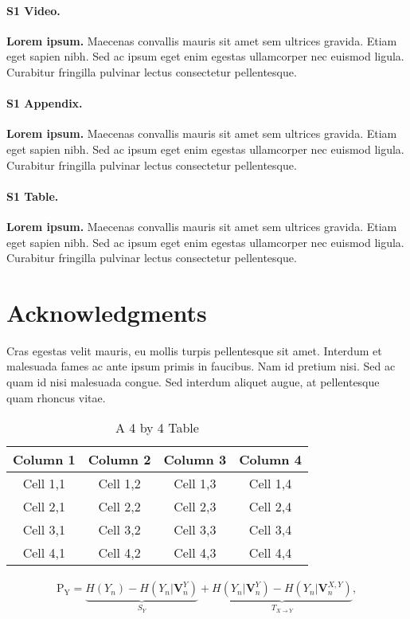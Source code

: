 \documentclass[10pt,letterpaper]{article}
\begin{document}
\paragraph*{S1 Video.}
\label{S1_Video}
{\bf Lorem ipsum.}  Maecenas convallis mauris sit amet sem ultrices gravida. Etiam eget sapien nibh. Sed ac ipsum eget enim egestas ullamcorper nec euismod ligula. Curabitur fringilla pulvinar lectus consectetur pellentesque.

\paragraph*{S1 Appendix.}
\label{S1_Appendix}
{\bf Lorem ipsum.} Maecenas convallis mauris sit amet sem ultrices gravida. Etiam eget sapien nibh. Sed ac ipsum eget enim egestas ullamcorper nec euismod ligula. Curabitur fringilla pulvinar lectus consectetur pellentesque.

\paragraph*{S1 Table.}
\label{S1_Table}
{\bf Lorem ipsum.} Maecenas convallis mauris sit amet sem ultrices gravida. Etiam eget sapien nibh. Sed ac ipsum eget enim egestas ullamcorper nec euismod ligula. Curabitur fringilla pulvinar lectus consectetur pellentesque.

\section*{Acknowledgments}
Cras egestas velit mauris, eu mollis turpis pellentesque sit amet. Interdum et malesuada fames ac ante ipsum primis in faucibus. Nam id pretium nisi. Sed ac quam id nisi malesuada congue. Sed interdum aliquet augue, at pellentesque quam rhoncus vitae.



\begin{table}
  \centering
  \caption{A 4 by 4 Table}
 \begin{tabular}{cccc} %
    \hline %
    Column 1 & Column 2 & Column 3 & Column 4 \\
    \hline %
    Cell 1,1 & Cell 1,2 & Cell 1,3 & Cell 1,4 \\
    Cell 2,1 & Cell 2,2 & Cell 2,3 & Cell 2,4 \\
    Cell 3,1 & Cell 3,2 & Cell 3,3 & Cell 3,4 \\
    Cell 4,1 & Cell 4,2 & Cell 4,3 & Cell 4,4 \\
    \hline %
  \end{tabular}
\end{table}
\begin{eqnarray}
\label{eq:schemeP}
	\mathrm{P_Y} = \underbrace{H(Y_n) - H(Y_n|\mathbf{V}^{Y}_{n})}_{S_Y} + \underbrace{H(Y_n|\mathbf{V}^{Y}_{n})- H(Y_n|\mathbf{V}^{X,Y}_{n})}_{T_{X\rightarrow Y}},
\end{eqnarray}
\end{document}

